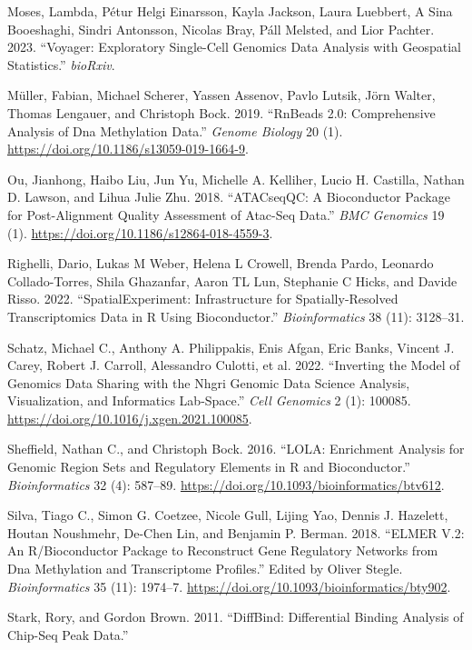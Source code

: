 \begin{thebibliography}{99.}
Moses, Lambda, Pétur Helgi Einarsson, Kayla Jackson, Laura Luebbert, A Sina Booeshaghi, Sindri Antonsson, Nicolas Bray, Páll Melsted, and Lior Pachter. 2023. ``Voyager: Exploratory Single-Cell Genomics Data Analysis with Geospatial Statistics.'' \emph{bioRxiv}.

Müller, Fabian, Michael Scherer, Yassen Assenov, Pavlo Lutsik, Jörn Walter, Thomas Lengauer, and Christoph Bock. 2019. ``RnBeads 2.0: Comprehensive Analysis of Dna Methylation Data.'' \emph{Genome Biology} 20 (1). \url{https://doi.org/10.1186/s13059-019-1664-9}.

Ou, Jianhong, Haibo Liu, Jun Yu, Michelle A. Kelliher, Lucio H. Castilla, Nathan D. Lawson, and Lihua Julie Zhu. 2018. ``ATACseqQC: A Bioconductor Package for Post-Alignment Quality Assessment of Atac-Seq Data.'' \emph{BMC Genomics} 19 (1). \url{https://doi.org/10.1186/s12864-018-4559-3}.

Righelli, Dario, Lukas M Weber, Helena L Crowell, Brenda Pardo, Leonardo Collado-Torres, Shila Ghazanfar, Aaron TL Lun, Stephanie C Hicks, and Davide Risso. 2022. ``SpatialExperiment: Infrastructure for Spatially-Resolved Transcriptomics Data in R Using Bioconductor.'' \emph{Bioinformatics} 38 (11): 3128--31.

Schatz, Michael C., Anthony A. Philippakis, Enis Afgan, Eric Banks, Vincent J. Carey, Robert J. Carroll, Alessandro Culotti, et al. 2022. ``Inverting the Model of Genomics Data Sharing with the Nhgri Genomic Data Science Analysis, Visualization, and Informatics Lab-Space.'' \emph{Cell Genomics} 2 (1): 100085. \url{https://doi.org/10.1016/j.xgen.2021.100085}.

Sheffield, Nathan C., and Christoph Bock. 2016. ``LOLA: Enrichment Analysis for Genomic Region Sets and Regulatory Elements in R and Bioconductor.'' \emph{Bioinformatics} 32 (4): 587--89. \url{https://doi.org/10.1093/bioinformatics/btv612}.

Silva, Tiago C., Simon G. Coetzee, Nicole Gull, Lijing Yao, Dennis J. Hazelett, Houtan Noushmehr, De-Chen Lin, and Benjamin P. Berman. 2018. ``ELMER V.2: An R/Bioconductor Package to Reconstruct Gene Regulatory Networks from Dna Methylation and Transcriptome Profiles.'' Edited by Oliver Stegle. \emph{Bioinformatics} 35 (11): 1974--7. \url{https://doi.org/10.1093/bioinformatics/bty902}.

Stark, Rory, and Gordon Brown. 2011. ``DiffBind: Differential Binding Analysis of Chip-Seq Peak Data.''


\end{thebibliography}
